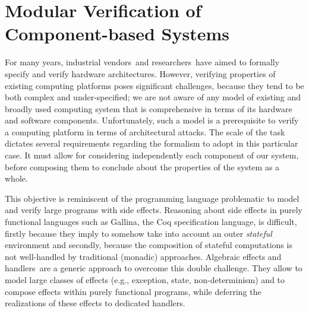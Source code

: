 \chapter{Modular Verification of Component-based Systems}
\label{chapter:freespec}


\vspace{1cm}\noindent
%
For many years, industrial vendors\,\cite{reid2017arm,leslie2015sgx} and
researchers\,\cite{chong2016report,choi2017kami} have aimed to formally specify
and verify hardware architectures.
%
However, verifying properties of existing computing platforms poses significant
challenges, because they tend to be both complex and under-specified; we are not
aware of any model of existing and broadly used computing system that is
comprehensive in terms of its hardware and software components.
%
Unfortunately, such a model is a prerequisite to verify a computing platform in
terms of architectural attacks.
%
The scale of the task dictates several requirements regarding the formalism to
adopt in this particular case.
%
It must allow for considering independently each component of our system, before
composing them to conclude about the properties of the system as a whole.

This objective is reminiscent of the programming language problematic to model
and verify large programs with side effects.
%
Reasoning about side effects in purely functional languages such as {\textsc
  Gallina}, the Coq specification language, is difficult, firstly because they
imply to somehow take into account an outer \emph{stateful} environment and
secondly, because the composition of stateful computations is not well-handled
by traditional (monadic) approaches.
%
Algebraic effects and handlers\,\cite{bauer2015effects} are a generic approach
to overcome this double challenge.
%
They allow to model large classes of effects (e.g., exception, state,
non-determinism) and to compose effects within purely functional programs, while
deferring the realizations of these effects to dedicated handlers.

